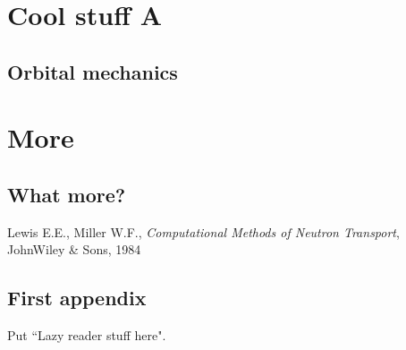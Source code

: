 \documentclass[10pt,letterpaper,openany,bibliography=totoc]{book}
\begin{document}
\chapter{Cool stuff A}
\minitoc
\section{Orbital mechanics}


\chapter{More}
\minitoc
\section{What more?}


\newpage
\begin{thebibliography}{1}
	
	 Lewis E.E., Miller W.F., {\em Computational Methods of Neutron Transport}, JohnWiley \& Sons, 1984
	   
\end{thebibliography}

\newpage
\begin{appendices}
\chapter{First appendix}
Put ``Lazy reader stuff here".
\end{appendices}
\end{document}
